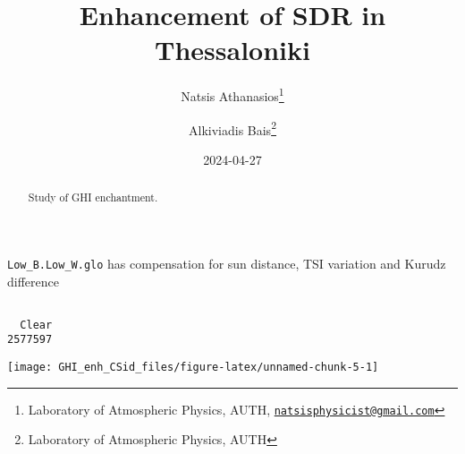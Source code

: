 \documentclass[
  10pt,
  a4paper,oneside]{article}
\title{Enhancement of SDR in Thessaloniki}
\author{Natsis Athanasios\footnote{Laboratory of Atmospheric Physics, AUTH, \href{mailto:natsisphysicist@gmail.com}{\nolinkurl{natsisphysicist@gmail.com}}} \and Alkiviadis Bais\footnote{Laboratory of Atmospheric Physics, AUTH}}
\date{2024-04-27}
\newenvironment{Shaded}{\begin{snugshade}}{\end{snugshade}}
\newcommand{\DocumentationTok}[1]{\textcolor[rgb]{0.56,0.35,0.01}{\textbf{\textit{#1}}}}
\newcommand{\FunctionTok}[1]{\textcolor[rgb]{0.13,0.29,0.53}{\textbf{#1}}}
\newcommand{\NormalTok}[1]{#1}
\newcommand{\OtherTok}[1]{\textcolor[rgb]{0.56,0.35,0.01}{#1}}
\newcommand{\SpecialCharTok}[1]{\textcolor[rgb]{0.81,0.36,0.00}{\textbf{#1}}}
\newcommand{\StringTok}[1]{\textcolor[rgb]{0.31,0.60,0.02}{#1}}
\begin{document}
\maketitle
\begin{abstract}
Study of GHI enchantment.
\end{abstract}

{
\hypersetup{linkcolor=}
\setcounter{tocdepth}{4}
\tableofcontents
}
\texttt{Low\_B.Low\_W.glo} has compensation for sun distance, TSI variation and Kurudz difference

\begin{Shaded}
\end{Shaded}

\begin{verbatim}

  Clear 
2577597 
\end{verbatim}

\begin{Shaded}
\end{Shaded}

\begin{center}\texttt{[image: GHI\_enh\_CSid\_files/figure-latex/unnamed-chunk-5-1]} \end{center}
\end{document}
